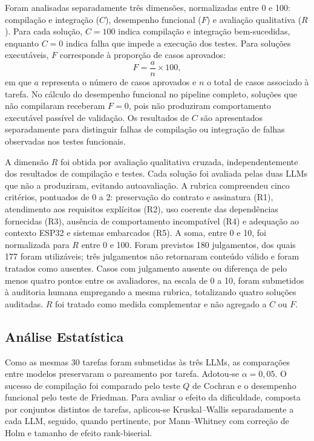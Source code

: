 \documentclass[12pt]{article}
\begin{document}
Foram analisadas separadamente três dimensões, normalizadas entre 0 e 100: compilação e integração ($C$), desempenho funcional ($F$) e avaliação qualitativa ($R$). Para cada solução, $C=100$ indica compilação e integração bem-sucedidas, enquanto $C=0$ indica falha que impede a execução dos testes. Para soluções executáveis, $F$ corresponde à proporção de casos aprovados:
\begin{equation}
F = \frac{a}{n} \times 100,
\label{eq:funcional}
\end{equation}
em que $a$ representa o número de casos aprovados e $n$ o total de casos associado à tarefa. No cálculo do desempenho funcional no pipeline completo, soluções que não compilaram receberam $F=0$, pois não produziram comportamento executável passível de validação. Os resultados de $C$ são apresentados separadamente para distinguir falhas de compilação ou integração de falhas observadas nos testes funcionais.

A dimensão $R$ foi obtida por avaliação qualitativa cruzada, independentemente dos resultados de compilação e testes. Cada solução foi avaliada pelas duas LLMs que não a produziram, evitando autoavaliação. A rubrica compreendeu cinco critérios, pontuados de 0 a 2: preservação do contrato e assinatura (R1), atendimento aos requisitos explícitos (R2), uso coerente das dependências fornecidas (R3), ausência de comportamento incompatível (R4) e adequação ao contexto ESP32 e sistemas embarcados (R5). A soma, entre 0 e 10, foi normalizada para $R$ entre 0 e 100. Foram previstos 180 julgamentos, dos quais 177 foram utilizáveis; três julgamentos não retornaram conteúdo válido e foram tratados como ausentes. Casos com julgamento ausente ou diferença de pelo menos quatro pontos entre os avaliadores, na escala de 0 a 10, foram submetidos à auditoria humana empregando a mesma rubrica, totalizando quatro soluções auditadas. $R$ foi tratado como medida complementar e não agregado a $C$ ou $F$.

\subsection{Análise Estatística}
\label{sec:estatistica}

Como as mesmas 30 tarefas foram submetidas às três LLMs, as comparações entre modelos preservaram o pareamento por tarefa. Adotou-se $\alpha=0{,}05$. O sucesso de compilação foi comparado pelo teste $Q$ de Cochran e o desempenho funcional pelo teste de Friedman. Para avaliar o efeito da dificuldade, composta por conjuntos distintos de tarefas, aplicou-se Kruskal--Wallis separadamente a cada LLM, seguido, quando pertinente, por Mann--Whitney com correção de Holm e tamanho de efeito rank-biserial.
\end{document}
